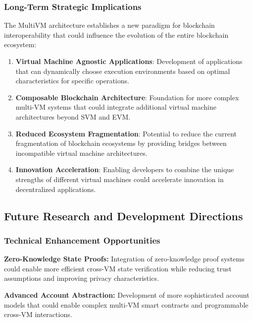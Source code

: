 \documentclass[11pt,a4paper]{article}
\begin{document}
\subsubsection{Long-Term Strategic Implications}

The MultiVM architecture establishes a new paradigm for blockchain interoperability that could influence the evolution of the entire blockchain ecosystem:

\begin{enumerate}
    \item \textbf{Virtual Machine Agnostic Applications}: Development of applications that can dynamically choose execution environments based on optimal characteristics for specific operations.
    
    \item \textbf{Composable Blockchain Architecture}: Foundation for more complex multi-VM systems that could integrate additional virtual machine architectures beyond SVM and EVM.
    
    \item \textbf{Reduced Ecosystem Fragmentation}: Potential to reduce the current fragmentation of blockchain ecosystems by providing bridges between incompatible virtual machine architectures.
    
    \item \textbf{Innovation Acceleration}: Enabling developers to combine the unique strengths of different virtual machines could accelerate innovation in decentralized applications.
\end{enumerate}

\subsection{Future Research and Development Directions}

\subsubsection{Technical Enhancement Opportunities}

\textbf{Zero-Knowledge State Proofs:}
Integration of zero-knowledge proof systems could enable more efficient cross-VM state verification while reducing trust assumptions and improving privacy characteristics.

\textbf{Advanced Account Abstraction:}
Development of more sophisticated account models that could enable complex multi-VM smart contracts and programmable cross-VM interactions.
\end{document}
